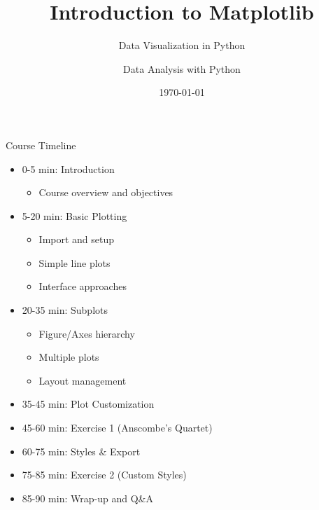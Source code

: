 \documentclass{beamer}
\title{Introduction to Matplotlib}
\subtitle{Data Visualization in Python}
\author{Data Analysis with Python}
\date{\today}
\begin{document}
\begin{frame}
    \titlepage
\end{frame}

\begin{frame}{Course Timeline}
    \begin{itemize}
        \item 0-5 min: Introduction
        \begin{itemize}
            \item Course overview and objectives
        \end{itemize}
        \item 5-20 min: Basic Plotting
        \begin{itemize}
            \item Import and setup
            \item Simple line plots
            \item Interface approaches
        \end{itemize}
        \item 20-35 min: Subplots
        \begin{itemize}
            \item Figure/Axes hierarchy
            \item Multiple plots
            \item Layout management
        \end{itemize}
        \item 35-45 min: Plot Customization
        \item 45-60 min: Exercise 1 (Anscombe's Quartet)
        \item 60-75 min: Styles \& Export
        \item 75-85 min: Exercise 2 (Custom Styles)
        \item 85-90 min: Wrap-up and Q\&A
    \end{itemize}
\end{frame}
\end{document}
